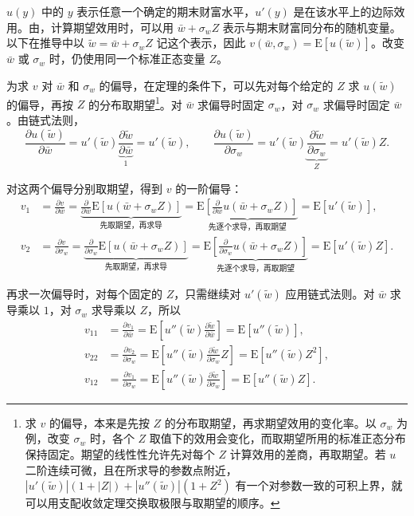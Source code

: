 \begin{solution}[label-content={证明},blank-type=none]
$u(y)$ 中的 $y$ 表示任意一个确定的期末财富水平，$u'(y)$ 是在该水平上的边际效用。由，计算期望效用时，可以用 $\bar w+\sigma_w Z$ 表示与期末财富同分布的随机变量。以下在推导中以 $\widetilde w=\bar w+\sigma_w Z$ 记这个表示，因此 $v(\bar w,\sigma_w)=\mathrm E[u(\widetilde w)]$。改变 $\bar w$ 或 $\sigma_w$ 时，仍使用同一个标准正态变量 $Z$。

为求 $v$ 对 $\bar w$ 和 $\sigma_w$ 的偏导，在定理的条件下，可以先对每个给定的 $Z$ 求 $u(\widetilde w)$ 的偏导，再按 $Z$ 的分布取期望\footnote{求 $v$ 的偏导，本来是先按 $Z$ 的分布取期望，再求期望效用的变化率。以 $\sigma_w$ 为例，改变 $\sigma_w$ 时，各个 $Z$ 取值下的效用会变化，而取期望所用的标准正态分布保持固定。期望的线性性允许先对每个 $Z$ 计算效用的差商，再取期望。若 $u$ 二阶连续可微，且在所求导的参数点附近，$|u'(\widetilde w)|(1+|Z|)+|u''(\widetilde w)|(1+Z^2)$ 有一个对参数一致的可积上界，就可以用支配收敛定理交换取极限与取期望的顺序。}。对 $\bar w$ 求偏导时固定 $\sigma_w$，对 $\sigma_w$ 求偏导时固定 $\bar w$。由链式法则，
\[
 \frac{\partial u(\widetilde w)}{\partial\bar w}
 =u'(\widetilde w)\underbrace{\frac{\partial \widetilde w}{\partial\bar w}}_{1}
 =u'(\widetilde w),
 \qquad
 \frac{\partial u(\widetilde w)}{\partial\sigma_w}
 =u'(\widetilde w)\underbrace{\frac{\partial \widetilde w}{\partial\sigma_w}}_{Z}
 =u'(\widetilde w)Z.
\]

对这两个偏导分别取期望，得到 $v$ 的一阶偏导：
\[
 \begin{aligned}
 v_1&=\frac{\partial v}{\partial\bar w}
 =\underbrace{\frac{\partial}{\partial\bar w}\mathrm E[u(\bar w+\sigma_w Z)]}_{\text{先取期望，再求导}}
 =\underbrace{\mathrm E\!\left[\frac{\partial}{\partial\bar w}u(\bar w+\sigma_w Z)\right]}_{\text{先逐个求导，再取期望}}
 =\mathrm E[u'(\widetilde w)],\\[0.4em]
 v_2&=\frac{\partial v}{\partial\sigma_w}
 =\underbrace{\frac{\partial}{\partial\sigma_w}\mathrm E[u(\bar w+\sigma_w Z)]}_{\text{先取期望，再求导}}
 =\underbrace{\mathrm E\!\left[\frac{\partial}{\partial\sigma_w}u(\bar w+\sigma_w Z)\right]}_{\text{先逐个求导，再取期望}}
 =\mathrm E[u'(\widetilde w)Z].
 \end{aligned}
\]

再求一次偏导时，对每个固定的 $Z$，只需继续对 $u'(\widetilde w)$ 应用链式法则。对 $\bar w$ 求导乘以 $1$，对 $\sigma_w$ 求导乘以 $Z$，所以
\[
 \begin{aligned}
 v_{11}
 &=\frac{\partial v_1}{\partial\bar w}
 =\mathrm E\!\left[u''(\widetilde w)\frac{\partial\widetilde w}{\partial\bar w}\right]
 =\mathrm E[u''(\widetilde w)],\\
 v_{22}
 &=\frac{\partial v_2}{\partial\sigma_w}
 =\mathrm E\!\left[u''(\widetilde w)\frac{\partial\widetilde w}{\partial\sigma_w}Z\right]
 =\mathrm E[u''(\widetilde w)Z^2],\\
 v_{12}
 &=\frac{\partial v_1}{\partial\sigma_w}
 =\mathrm E\!\left[u''(\widetilde w)\frac{\partial\widetilde w}{\partial\sigma_w}\right]
 =\mathrm E[u''(\widetilde w)Z].
 \end{aligned}
\]


\end{solution}
